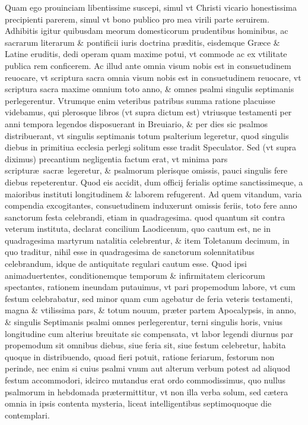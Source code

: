 \documentclass[a5paper,10pt]{book}
\def\ae{æ}
\begin{document}
Quam ego prouinciam libentissime suscepi, simul vt Christi vicario honestissima precipienti parerem, simul vt bono publico pro mea virili parte seruirem.
Adhibitis igitur quibusdam meorum domesticorum prudentibus hominibus, ac sacrarum literarum \& pontificii iuris doctrina pr\ae ditis, eisdemque Gr\ae ce \& Latine eruditis, dedi operam quam %
maxime potui, vt commode ac ex vtilitate publica rem conficerem.
Ac illud ante omnia visum nobis est in consuetudinem reuocare, vt scriptura sacra omnia visum nobis est in consuetudinem reuocare, vt scriptura sacra maxime omnium toto anno, \& omnes %
psalmi singulis septimanis perlegerentur.%
Vtrumque enim veteribus patribus summa ratione placuisse videbamus, qui plerosque libros (vt supra dictum est) vtriusque testamenti per anni tempora legendos disposuerant in Breuiario, \& per dies sic psalmos distribuerant, vt singulis septimanis
totum psalterium legeretur, quod singulis diebus in primitiua ecclesia perlegi solitum esse tradit Speculator.
Sed (vt supra diximus) precantium negligentia factum erat, vt minima pars scriptur\ae \ sacr\ae \ legeretur, \& psalmorum plerisque omissis, pauci singulis fere diebus repeterentur.
Quod eis accidit, dum officij ferialis optime sanctissimeque, a maioribus instituti longitudinem \& laborem refugerent.
Ad quem vitandum, varia compendia excogitantes, consuetudinem induxerunt omissis feriis, toto fere anno sanctorum %
festa celebrandi, etiam in quadragesima.
quod %
quantum sit contra veterum instituta, declarat concilium Laodicenum, quo cautum est, ne in quadragesima martyrum natalitia celebrentur, \& item Toletanum decimum, in quo traditur, nihil esse in quadragesima de sanctorum %
solennitatibus %
celebrandum, idque de antiquitate regulari cautum esse.
Quod ipsi animaduertentes, conditionemque temporum \& infirmitatem clericorum spectantes, rationem ineundam putauimus, vt pari propemodum labore, vt cum festum celebrabatur, sed minor quam %
cum agebatur de feria veteris testamenti, magna \& vtilissima pars, \& totum nouum, pr\ae ter partem Apocalypsis, in anno, \& singulis Septimanis psalmi omnes perlegerentur, terni singulis horis, vnius longitudine cum alterius breuitate sic compensata, vt labor legendi diurnus par propemodum sit omnibus diebus, siue feria sit, siue festum celebretur, habita quoque in distribuendo, quoad fieri potuit, ratione feriarum, festorum non perinde, nec enim si cuius psalmi vnum aut alterum verbum potest ad aliquod festum accommodori, idcirco mutandus erat ordo commodissimus, quo nullus psalmorum in hebdomada pr\ae termittitur, vt non illa verba solum, sed c\ae tera omnia in ipsis contenta mysteria, liceat intelligentibus septimoquoque die contemplari.
\end{document}
